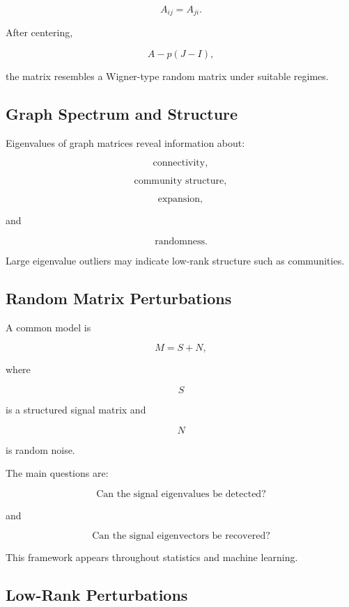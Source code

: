 \[
A_{ij}=A_{ji}.
\]

After centering,

\[
A-p(J-I),
\]

the matrix resembles a Wigner-type random matrix under suitable
regimes.

\subsection{Graph Spectrum and Structure}
\label{subsec:graph-spectrum-random}

Eigenvalues of graph matrices reveal information about:

\[
\boxed{
\text{connectivity},
}
\]

\[
\boxed{
\text{community structure},
}
\]

\[
\boxed{
\text{expansion},
}
\]

and

\[
\boxed{
\text{randomness}.
}
\]

Large eigenvalue outliers may indicate low-rank structure such as
communities.

\subsection{Random Matrix Perturbations}
\label{subsec:random-matrix-perturbations}

A common model is

\[
\boxed{
M
=
S+N,
}
\]

where

\[
S
\]

is a structured signal matrix and

\[
N
\]

is random noise.

The main questions are:

\[
\boxed{
\text{Can the signal eigenvalues be detected?}
}
\]

and

\[
\boxed{
\text{Can the signal eigenvectors be recovered?}
}
\]

This framework appears throughout statistics and machine learning.

\subsection{Low-Rank Perturbations}
\label{subsec:low-rank-perturbations}

